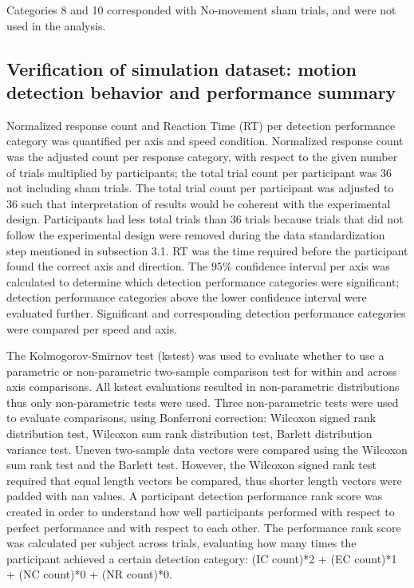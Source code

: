 \documentclass[11pt, onecolumn]{article}
\begin{document}
Categories 8 and 10 corresponded with No-movement sham trials, and were not used in the analysis.


\subsection{Verification of simulation dataset: motion detection behavior and performance summary}
Normalized response count and Reaction Time (RT) per detection performance category was quantified per axis and speed condition.  Normalized response count was the adjusted count per response category, with respect to the given number of trials multiplied by participants; the total trial count per participant was 36 not including sham trials.  The total trial count per participant was adjusted to 36 such that interpretation of results would be coherent with the experimental design.  Participants had less total trials than 36 trials because trials that did not follow the experimental design were removed during the data standardization step mentioned in subsection 3.1.  RT was the time required before the participant found the correct axis and direction.  The $95\%$ confidence interval per axis was calculated to determine which detection performance categories were significant; detection performance categories above the lower confidence interval were evaluated further.  Significant and corresponding detection performance categories were compared per speed and axis.  

The Kolmogorov-Smirnov test (kstest) was used to evaluate whether to use a parametric or non-parametric two-sample comparison test for within and across axis comparisons.  All kstest evaluations resulted in non-parametric distributions thus only non-parametric tests were used.  Three non-parametric tests were used to evaluate comparisons, using Bonferroni correction: Wilcoxon signed rank distribution test, Wilcoxon sum rank distribution test, Barlett distribution variance test.  Uneven two-sample data vectors were compared using the Wilcoxon sum rank test and the Barlett test.  However, the Wilcoxon signed rank test required that equal length vectors be compared, thus shorter length vectors were padded with nan values.
A participant detection performance rank score was created in order to understand how well participants performed with respect to perfect performance and with respect to each other.  The performance rank score was calculated per subject across trials, evaluating how many times the participant achieved a certain detection category: 
(IC count)*2 + (EC count)*1 + (NC count)*0 + (NR count)*0.
\end{document}
